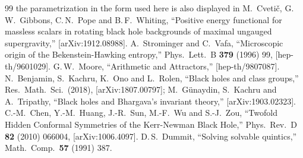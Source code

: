 \documentclass[11pt]{article}
\theoremstyle{definition}
\theoremstyle{remark}
\begin{document}
\begin{thebibliography}{99}
the parametrization in the form used here is also displayed in
M.~Cveti\v{c}, G.\,W.~Gibbons, C.\,N.~Pope and B.\,F.~Whiting,
``Positive energy functional for massless scalars in rotating black hole
backgrounds of maximal ungauged supergravity,'' [arXiv:1912.08988].
 A.~Strominger and C.~Vafa,
``Microscopic origin of the Bekenstein-Hawking entropy,''
Phys.\ Lett.\ B {\bf 379} (1996) 99, [hep-th/9601029].
 G.\,W.~Moore, ``Arithmetic and Attractors,''
[hep-th/9807087].
 N.~Benjamin, S.~Kachru, K.~Ono and L.~Rolen,
``Black holes and class groups,'' Res.\ Math.\ Sci.\ (2018),
[arXiv:1807.00797]; M.~G\"unaydin, S.~Kachru and A.~Tripathy,
``Black holes and Bhargava's invariant theory,'' [arXiv:1903.02323].
 C.-M.~Chen, Y.-M.~Huang, J.-R.~Sun, M.-F.~Wu and S.-J.~Zou,
``Twofold Hidden Conformal Symmetries of the Kerr-Newman Black Hole,''
Phys.\ Rev.\ D {\bf 82} (2010) 066004, [arXiv:1006.4097].
 D.\,S.~Dummit, ``Solving solvable quintics,''
Math.\ Comp.\ {\bf 57} (1991) 387.
\end{thebibliography}
\end{document}
